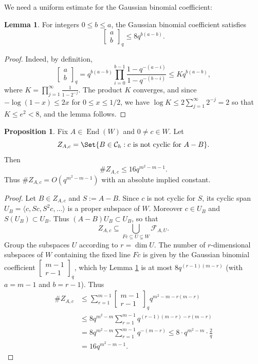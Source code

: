 \documentclass[preprint,11pt]{amsart}
\newcommand{\CalC}{\mathcal{C}}
\newcommand{\CalF}{\mathcal{F}}
\theoremstyle{definition}
\numberwithin{thm}{section}
\newtheorem{prop}[thm]{Proposition}
\newtheorem{lem}[thm]{Lemma}
\newcommand{\End}{\operatorname{End}}
\newcommand{\ip}[1]{\langle #1 \rangle}
\newcommand{\trm}[1]{\textrm{#1}}
\newcommand{\sub}{\subset}
\begin{document}
\noindent We need a uniform estimate for the Gaussian binomial coefficient: 
\begin{lem}\label{gauss_bc}
For integers $0 \leq b \leq a$, the Gaussian binomial coefficient satisfies
$$
\begin{bmatrix}a \\ b \end{bmatrix}_q \leq 8 q^{b(a-b)}.
$$
\end{lem}
\begin{proof}
Indeed, by definition, 
$$
\begin{bmatrix}a \\ b \end{bmatrix}_q = q^{b(a-b)} \prod_{i = 0}^{b-1} \frac{1-q^{-(a-i)}}{1- q^{-(b-i)}} \leq K q^{b(a-b)},
$$
where $K = \prod_{j =1}^{\infty} \frac{1}{1- 2^{-j}}$. The product $K$ converges, and since $- \log(1-x) \leq 2x$ for $0 \leq x \leq 1/2$, we have $\log K \leq 2 \sum_{j =1}^{\infty} 2^{-j} = 2$ so that $K \leq e^2 < 8$, and the lemma follows.
\end{proof}




\begin{prop}\label{nonzstable}
Fix $A \in \End(W)$ and $0 \neq c \in W$. Let 
$$
Z_{A,c} = \Set{B \in \CalC_h : c \trm{ is not cyclic for } A - B}.
$$
Then 
$$
\#Z_{A,c} \leq 16 q^{m^2 - m -1}.
$$
Thus $\#Z_{A,c} = O(q^{m^2 - m -1})$ with an absolute implied constant.

\end{prop}

\begin{proof}
Let $B \in Z_{A,c}$ and $S := A-B$. Since $c$ is not cyclic for $S$, its cyclic span $U_B = \ip{c, Sc, S^2c, \ldots}$ is a proper subspace of $W$. Moreover $c \in U_B$ and $S(U_B) \sub U_B$. Thus $(A-B) U_B \sub U_B$, so that 
$$	
Z_{A,c} \subseteq \bigcup_{F c \subseteq U  \subsetneq W} 
\CalF_{A, U}.
$$
Group the subspaces $U$ according to $r= \dim U$. The number of $r$-dimensional subspaces of $W$ containing the fixed line $Fc$ is given by the Gaussian binomial coefficient  $\begin{bmatrix}m-1 \\ r-1\end{bmatrix}_q$, which by Lemma \ref{gauss_bc} is at most $8 q^{(r-1)(m-r)}$ (with $a = m-1$ and $b = r-1$). Thus
\begin{align*}
\#Z_{A,c} &\leq \sum_{r = 1}^{m-1} \begin{bmatrix} m-1 \\ r-1 \end{bmatrix}_q	 q^{m^2-m - r(m-r)} \\
& \leq 8 q^{m^2-m} \sum_{r = 1}^{m-1} q^{(r-1)(m-r) - r(m-r)} \\
&= 8 q^{m^2 -m} \sum_{r = 1}^{m-1} q^{-(m-r)} \leq 8 \cdot q^{m^2 -m} \cdot \frac{2}{q} \\
&= 16 q^{m^2 - m -1}.
\end{align*}

\end{proof}
\end{document}
